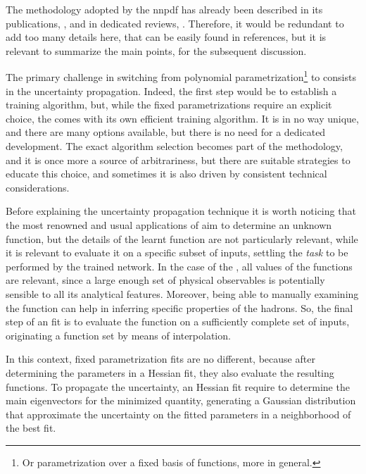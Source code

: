 
The methodology adopted by the \acrlong{nnpdf} has already been described in
its publications, \cite{Forte:2002fg,Ball:2008by}, and in dedicated reviews,
\cite{Forte:2020yip,Ethier:2020way}.
%
Therefore, it would be redundant to add too many details here, that can be
easily found in references, but it is relevant to summarize the main points,
for the subsequent discussion.

The primary challenge in switching from polynomial parametrization\footnote{
  Or parametrization over a fixed basis of functions, more in general.
} to \nn consists in the uncertainty propagation.
Indeed, the first step would be to establish a training algorithm, but, while
the fixed parametrizations require an explicit choice, the \nn comes with its
own efficient training algorithm.
%
It is in no way unique, and there are many options available, but there is no
need for a dedicated development.
The exact algorithm selection becomes part of the methodology, and it is once
more a source of arbitrariness, but there are suitable strategies to educate
this choice, and sometimes it is also driven by consistent technical
considerations.

Before explaining the uncertainty propagation technique it is worth noticing
that the most renowned and usual applications of  aim to
determine an unknown function, but the details of the learnt function are not
particularly relevant, while it is relevant to evaluate it on a specific subset
of inputs, settling the \textit{task} to be performed by the trained network.
%
In the case of the \pdfs, all values of the functions are relevant, since a
large enough set of physical observables is potentially sensible to all its
analytical features.
%
Moreover, being able to manually examining the function can help in inferring
specific properties of the hadrons.
%
So, the final step of an \nn fit is to evaluate the function on a sufficiently
complete set of inputs, originating a function set by means of interpolation.

In this context, fixed parametrization fits are no different, because after
determining the parameters in a Hessian fit, they also evaluate the resulting
functions.
%
To propagate the uncertainty, an Hessian fit require to determine the main
eigenvectors for the minimized quantity, generating a Gaussian distribution
that approximate the uncertainty on the fitted parameters in a neighborhood of
the best fit.


